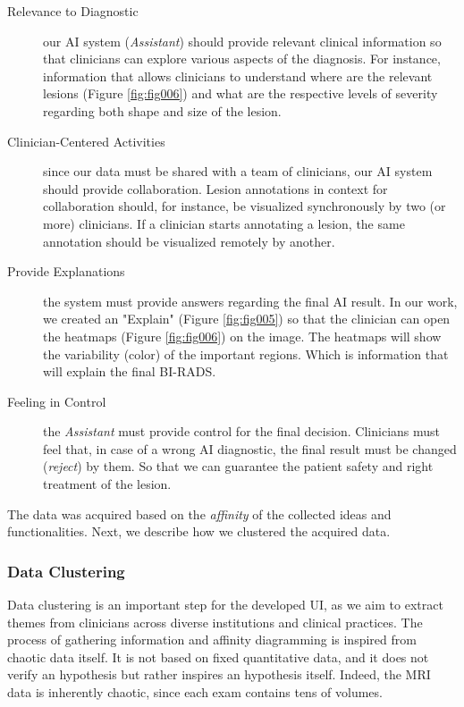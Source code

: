 \begin{description}
\item[Relevance to Diagnostic] our AI system ({\it Assistant}) should provide relevant clinical information so that clinicians can explore various aspects of the diagnosis. For instance, information that allows clinicians to understand where are the relevant lesions (Figure \ref{fig:fig006}) and what are the respective levels of severity regarding both shape and size of the lesion.

\item[Clinician-Centered Activities] since our data must be shared with a team of clinicians, our AI system should provide collaboration. Lesion annotations in context for collaboration should, for instance, be visualized synchronously by two (or more) clinicians. If a clinician starts annotating a lesion, the same annotation should be visualized remotely by another.

\item[Provide Explanations] the system must provide answers regarding the final AI result. In our work, we created an "Explain" (Figure \ref{fig:fig005}) so that the clinician can open the heatmaps (Figure \ref{fig:fig006}) on the image. The heatmaps will show the variability (color) of the important regions. Which is information that will explain the final BI-RADS.

\item[Feeling in Control] the {\it Assistant} must provide control for the final decision. Clinicians must feel that, in case of a wrong AI diagnostic, the final result must be changed ({\it reject}) by them. So that we can guarantee the patient safety and right treatment of the lesion.
\end{description}

The data was acquired based on the {\it affinity} of the collected ideas and functionalities.
Next, we describe how we clustered the acquired data.

\subsubsection{Data Clustering}
\label{sec:clustering}

Data clustering is an important step for the developed UI, as we aim to extract themes from clinicians across diverse institutions and clinical practices.
The process of gathering information and affinity diagramming is inspired from chaotic data itself.
It is not based on fixed quantitative data, and it does not verify an hypothesis but rather inspires an hypothesis itself.
Indeed, the MRI data is inherently chaotic, since each exam contains tens of volumes.

